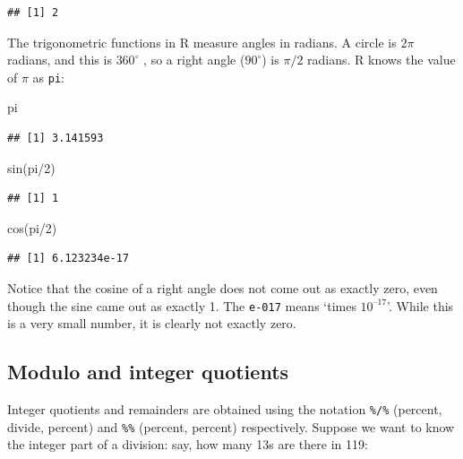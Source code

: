 \documentclass[
]{book}
\newenvironment{Shaded}{\begin{snugshade}}{\end{snugshade}}
\newcommand{\DecValTok}[1]{\textcolor[rgb]{0.00,0.00,0.81}{#1}}
\newcommand{\FunctionTok}[1]{\textcolor[rgb]{0.00,0.00,0.00}{#1}}
\newcommand{\NormalTok}[1]{#1}
\newcommand{\SpecialCharTok}[1]{\textcolor[rgb]{0.00,0.00,0.00}{#1}}
\theoremstyle{definition}
\theoremstyle{definition}
\theoremstyle{definition}
\theoremstyle{definition}
\theoremstyle{remark}
\begin{document}
\begin{verbatim}
## [1] 2
\end{verbatim}

The trigonometric functions in R measure angles in radians. A circle is \(2\pi\) radians, and this is \(360^\circ\) , so a right angle (\(90^\circ\)) is \(\pi / 2\) radians. R knows the value of \(\pi\) as \texttt{pi}:

\begin{Shaded}
\begin{Highlighting}[]
\NormalTok{pi}
\end{Highlighting}
\end{Shaded}

\begin{verbatim}
## [1] 3.141593
\end{verbatim}

\begin{Shaded}
\begin{Highlighting}[]
\FunctionTok{sin}\NormalTok{(pi}\SpecialCharTok{/}\DecValTok{2}\NormalTok{)}
\end{Highlighting}
\end{Shaded}

\begin{verbatim}
## [1] 1
\end{verbatim}

\begin{Shaded}
\begin{Highlighting}[]
\FunctionTok{cos}\NormalTok{(pi}\SpecialCharTok{/}\DecValTok{2}\NormalTok{)}
\end{Highlighting}
\end{Shaded}

\begin{verbatim}
## [1] 6.123234e-17
\end{verbatim}

Notice that the cosine of a right angle does not come out as exactly zero, even though the sine came out as exactly 1. The \texttt{e-017} means `times \(10^{–17}\)'. While this is a very small number, it is clearly not exactly zero.

\hypertarget{modulo-and-integer-quotients}{%
\subsection{Modulo and integer quotients}\label{modulo-and-integer-quotients}}

Integer quotients and remainders are obtained using the notation \texttt{\%/\%} (percent, divide, percent) and \texttt{\%\%} (percent, percent) respectively. Suppose we want to know the integer part of a division: say, how many 13s are there in 119:
\end{document}
